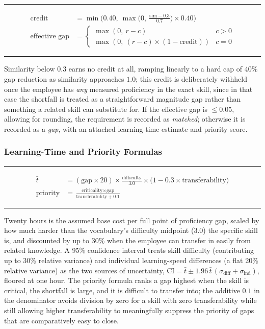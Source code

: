 \documentclass[11pt,a4paper]{article}
\newenvironment{formulabox}
  {\begin{center}\color{TPteal}\rule{0.92\linewidth}{0.8pt}\par\vspace{5pt}\color{TPnavy}}
  {\par\vspace{3pt}\color{TPteal}\rule{0.92\linewidth}{0.8pt}\end{center}}
\begin{document}
\begin{formulabox}
\begin{align}
\label{eq:semcredit}
\text{credit} &= \min\!\Big(0.40,\ \max\big(0,\ \tfrac{\text{sim} - 0.3}{0.7}\big) \times 0.40\Big) \\
\label{eq:effgap}
\text{effective gap} &= \begin{cases}
\max(0,\ r - c) & c > 0 \\
\max(0,\ (r - c) \times (1 - \text{credit})) & c = 0
\end{cases}
\end{align}
\end{formulabox}

Similarity below $0.3$ earns no credit at all, ramping linearly to a hard cap of $40\%$ gap reduction as similarity approaches $1.0$; this credit is deliberately withheld once the employee has \emph{any} measured proficiency in the exact skill, since in that case the shortfall is treated as a straightforward magnitude gap rather than something a related skill can substitute for. If the effective gap is $\leq 0.05$, allowing for rounding, the requirement is recorded as \emph{matched}; otherwise it is recorded as a \emph{gap}, with an attached learning-time estimate and priority score.

\subsubsection{Learning-Time and Priority Formulas}

\begin{formulabox}
\begin{align}
\label{eq:learntime}
\bar{t} &= (\text{gap} \times 20) \times \frac{\text{difficulty}}{3.0} \times \big(1 - 0.3 \times \text{transferability}\big) \\
\label{eq:priority}
\text{priority} &= \frac{\text{criticality} \times \text{gap}}{\text{transferability} + 0.1}
\end{align}
\end{formulabox}

Twenty hours is the assumed base cost per full point of proficiency gap, scaled by how much harder than the vocabulary's difficulty midpoint (3.0) the specific skill is, and discounted by up to 30\% when the employee can transfer in easily from related knowledge. A 95\% confidence interval treats skill difficulty (contributing up to 30\% relative variance) and individual learning-speed differences (a flat 20\% relative variance) as the two sources of uncertainty, $\mathrm{CI} = \bar{t} \pm 1.96\,\bar{t}\,(\sigma_{\text{diff}} + \sigma_{\text{ind}})$, floored at one hour. The priority formula ranks a gap highest when the skill is critical, the shortfall is large, and it is difficult to transfer into; the additive $0.1$ in the denominator avoids division by zero for a skill with zero transferability while still allowing higher transferability to meaningfully suppress the priority of gaps that are comparatively easy to close.
\end{document}
